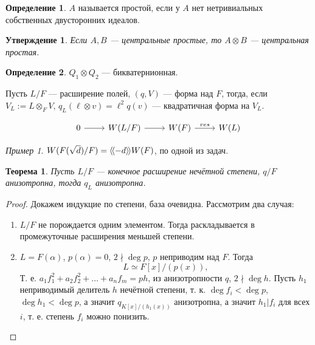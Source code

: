\documentclass{article}
\newtheorem*{theorem}{Теорема}
\newtheorem*{statement}{Утверждение}
\theoremstyle{definition}
\newtheorem*{definition}{Определение}
\theoremstyle{remark}
\newtheorem*{example}{Пример}
\newcommand{\llangle}{\langle \hspace{-.5mm} \langle}
\newcommand{\rrangle}{\rangle \hspace{-.5mm} \rangle}
\begin{document}
\begin{definition}
    $A$ называется простой, если у $A$ нет нетривиальных собственных двусторонних идеалов.
\end{definition}

\begin{statement}
    Если $A, B$ --- центральные простые, то $A \otimes B$ --- центральная простая.
\end{statement}

\begin{definition}
    $Q_1 \otimes Q_2$ --- бикватернионная.
\end{definition}

Пусть $L / F$ --- расширение полей, $(q, V)$ --- форма над $F$, тогда, если $V_L := L \otimes_F V$, $q_L(\ell \otimes v) = \ell^2 q(v)$ --- квадратичная форма на $V_L$.

\begin{equation*}
\begin{tikzcd}
    0 \rar & W(L/F) \rar & W(F) \rar{res} & W(L)
\end{tikzcd}
\end{equation*}

\begin{example}
    $W(F(\sqrt{d}) / F) = \llangle -d \rrangle W(F)$, по одной из задач.
\end{example}

\begin{theorem}
    Пусть $L / F$ --- конечное расширение нечётной степени, $q / F$ анизотропна, тогда $q_L$ анизотропна.
\end{theorem}
\begin{proof}
    Докажем индукцие по степени, база очевидна. Рассмотрим два случая:
    \begin{enumerate}[nosep, wide, label = \arabic*)]
        \item $L / F$ не порождается одним элементом. Тогда раскладывается в промежуточные расширения меньшей степени.
        \item $L = F(\alpha)$, $p(\alpha) = 0$, $2 \nmid \deg p$, $p$ неприводим над $F$. Тогда
        $$L \simeq F[x]/(p(x)),$$
        Т. е. $a_1 f_1^2 + a_2 f_2^2 + \ldots + a_n f_m = ph$, из анизотропности $q$, $2 \nmid \deg h$. Пусть $h_1$ неприводимый делитель $h$ нечётной степени, т. к. $\deg f_i < \deg p$, $\deg h_1 < \deg p$, а значит $q_{K[x] / (h_1(x))}$ анизотропна, а значит $h_1 | f_i$ для всех $i$, т. е. степень $f_i$ можно понизить.
    \end{enumerate}
\end{proof}
 
\end{document}
